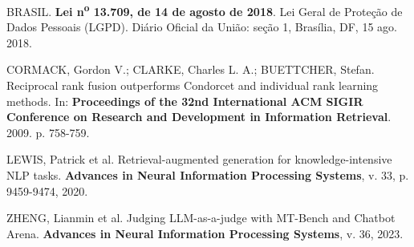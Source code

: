 \documentclass[11pt,a4paper]{article}
\begin{document}
\noindent BRASIL. \textbf{Lei n\textsuperscript{o} 13.709, de 14 de agosto de 2018}. Lei Geral de Proteção de Dados Pessoais (LGPD). Diário Oficial da União: seção 1, Brasília, DF, 15 ago. 2018.

\vspace{0.2cm}
\noindent CORMACK, Gordon V.; CLARKE, Charles L. A.; BUETTCHER, Stefan. Reciprocal rank fusion outperforms Condorcet and individual rank learning methods. In: \textbf{Proceedings of the 32nd International ACM SIGIR Conference on Research and Development in Information Retrieval}. 2009. p. 758-759.

\vspace{0.2cm}
\noindent LEWIS, Patrick et al. Retrieval-augmented generation for knowledge-intensive NLP tasks. \textbf{Advances in Neural Information Processing Systems}, v. 33, p. 9459-9474, 2020.

\vspace{0.2cm}
\noindent ZHENG, Lianmin et al. Judging LLM-as-a-judge with MT-Bench and Chatbot Arena. \textbf{Advances in Neural Information Processing Systems}, v. 36, 2023.
\end{document}
